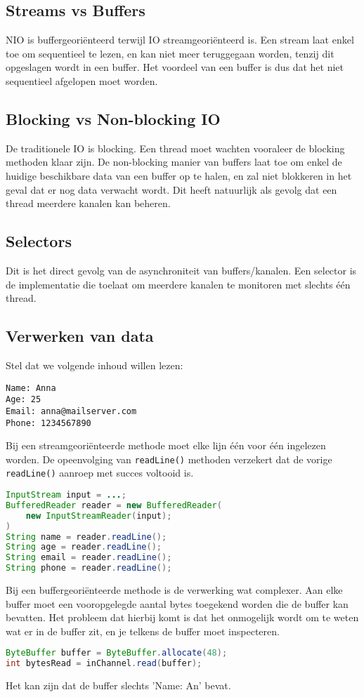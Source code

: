 \documentclass{report}
\begin{document}
\subsection{Streams vs Buffers}
NIO is buffergeoriënteerd terwijl IO streamgeoriënteerd is. Een stream laat enkel toe om sequentieel te lezen, en kan niet meer teruggegaan worden, tenzij dit opgeslagen wordt in een buffer. Het voordeel van een buffer is dus dat het niet sequentieel afgelopen moet worden. 
\subsection{Blocking vs Non-blocking IO}
De traditionele IO is blocking. Een thread moet wachten vooraleer de blocking methoden klaar zijn. De non-blocking manier van buffers laat toe om enkel de huidige beschikbare data van een buffer op te halen, en zal niet blokkeren in het geval dat er nog data verwacht wordt. Dit heeft natuurlijk als gevolg dat een thread meerdere kanalen kan beheren.
\subsection{Selectors}
Dit is het direct gevolg van de asynchroniteit van buffers/kanalen. Een selector is de implementatie die toelaat om meerdere kanalen te monitoren met slechts één thread.
\subsection{Verwerken van data}
Stel dat we volgende inhoud willen lezen:
\begin{lstlisting}
Name: Anna
Age: 25
Email: anna@mailserver.com
Phone: 1234567890
\end{lstlisting}
Bij een streamgeoriënteerde methode moet elke lijn één voor één ingelezen worden. De opeenvolging van \texttt{readLine()} methoden verzekert dat de vorige \texttt{readLine()} aanroep met succes voltooid is.
\begin{lstlisting}[language=java]
InputStream input = ...;
BufferedReader reader = new BufferedReader(
	new InputStreamReader(input);
)
String name = reader.readLine();
String age = reader.readLine();
String email = reader.readLine();
String phone = reader.readLine();
\end{lstlisting}
Bij een buffergeoriënteerde methode is de verwerking wat complexer. Aan elke buffer moet een vooropgelegde aantal bytes toegekend worden die de buffer kan bevatten. Het probleem dat hierbij komt is dat het onmogelijk wordt om te weten wat er in de buffer zit, en je telkens de buffer moet inspecteren.
\begin{lstlisting}[language=java]
ByteBuffer buffer = ByteBuffer.allocate(48);
int bytesRead = inChannel.read(buffer);
\end{lstlisting}
Het kan zijn dat de buffer slechts 'Name: An' bevat.
\end{document}
